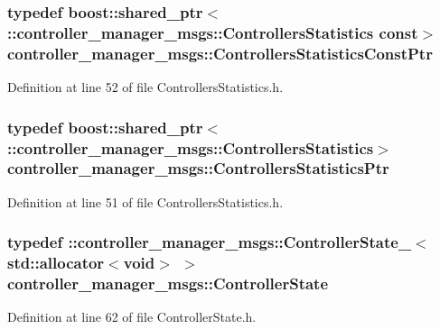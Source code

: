 \subsubsection[{\-Controllers\-Statistics\-Const\-Ptr}]{\setlength{\rightskip}{0pt plus 5cm}typedef boost\-::shared\-\_\-ptr$<$ \-::{\bf controller\-\_\-manager\-\_\-msgs\-::\-Controllers\-Statistics} const$>$ {\bf controller\-\_\-manager\-\_\-msgs\-::\-Controllers\-Statistics\-Const\-Ptr}}\label{namespacecontroller__manager__msgs_a447803d977fbedfbc37621a6690855be}


\-Definition at line 52 of file \-Controllers\-Statistics.\-h.

\subsubsection[{\-Controllers\-Statistics\-Ptr}]{\setlength{\rightskip}{0pt plus 5cm}typedef boost\-::shared\-\_\-ptr$<$ \-::{\bf controller\-\_\-manager\-\_\-msgs\-::\-Controllers\-Statistics}$>$ {\bf controller\-\_\-manager\-\_\-msgs\-::\-Controllers\-Statistics\-Ptr}}\label{namespacecontroller__manager__msgs_ad1db842b860d51dba03016b3a3c8dd07}


\-Definition at line 51 of file \-Controllers\-Statistics.\-h.

\subsubsection[{\-Controller\-State}]{\setlength{\rightskip}{0pt plus 5cm}typedef \-::{\bf controller\-\_\-manager\-\_\-msgs\-::\-Controller\-State\-\_\-}$<$std\-::allocator$<$void$>$ $>$ {\bf controller\-\_\-manager\-\_\-msgs\-::\-Controller\-State}}\label{namespacecontroller__manager__msgs_a1b189f5627744cc4d672e0f2570e9b13}


\-Definition at line 62 of file \-Controller\-State.\-h.

